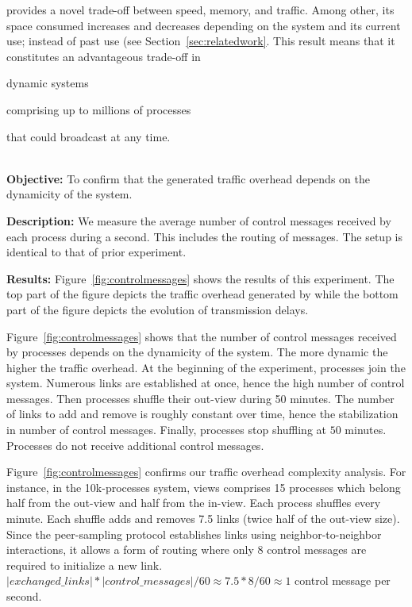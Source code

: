 \noindent \RPCBROADCAST provides a novel trade-off between speed, memory, and
traffic. Among other, its space consumed increases and decreases depending on
the system and its current use; instead of past use (see
Section~\ref{sec:relatedwork}. This result means that it constitutes an
advantageous trade-off in
\begin{inparaenum}[(i)]
\item dynamic systems
\item comprising up to millions of processes
\item that could broadcast at any time.
\end{inparaenum} \\

\noindent \textbf{Objective:} To confirm that the generated traffic overhead
depends on the dynamicity of the system.

\noindent \textbf{Description:} We measure the average number of control
messages received by each process during a second. This includes the routing of
messages. The setup is identical to that of prior experiment.

\noindent \textbf{Results:} Figure~\ref{fig:controlmessages} shows the results of
this experiment. The top part of the figure depicts the traffic overhead
generated by \RPCBROADCAST while the bottom part of the figure depicts the
evolution of transmission delays.

\noindent Figure~\ref{fig:controlmessages} shows that the number of control
messages received by processes depends on the dynamicity of the system. The more
dynamic the higher the traffic overhead. At the beginning of the experiment,
processes join the system. Numerous links are established at once, hence the
high number of control messages. Then processes shuffle their out-view during 50
minutes. The number of links to add and remove is roughly constant over time,
hence the stabilization in number of control messages. Finally, processes stop
shuffling at $50$ minutes. Processes do not receive additional control messages.

\noindent Figure~\ref{fig:controlmessages} confirms our traffic overhead
complexity analysis. For instance, in the 10k-processes system, views comprises
15 processes which belong half from the out-view and half from the in-view.
Each process shuffles every minute. Each shuffle adds and removes 7.5 links
(twice half of the out-view size). Since the peer-sampling protocol establishes
links using neighbor-to-neighbor interactions, it allows a form of routing where
only 8 control messages are required to initialize a new link.
$|exchanged\_links|*|control\_messages|/60 \approx 7.5*8/60 \approx 1$ control
message per second.

